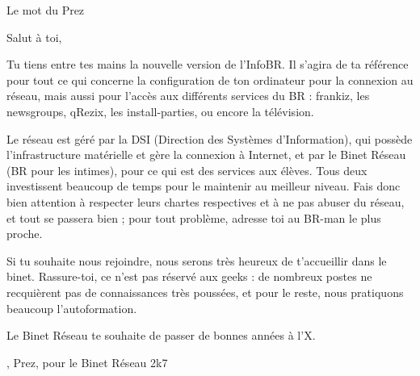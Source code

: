

\begin{center}
    { \Huge Le mot du Prez }
\end{center}

\indent \indent Salut \`a toi,

Tu tiens entre tes mains la nouvelle version de l'InfoBR. Il s'agira de ta r\'ef\'erence pour tout ce qui concerne la configuration de ton ordinateur pour la connexion au r\'eseau, mais aussi pour l'acc\`es aux diff\'erents services du BR :
frankiz, les newsgroups, qRezix, les install-parties, ou encore la t\'el\'evision.

Le r\'eseau est g\'er\'e par la DSI (Direction des Syst\`emes d'Information), qui poss\`ede l'infrastructure mat\'erielle et g\`ere la connexion \`a Internet,
et par le Binet R\'eseau (BR pour les intimes), pour ce qui est des services aux \'el\`eves. Tous deux investissent beaucoup de temps pour le maintenir au meilleur niveau.
Fais donc bien attention \`a respecter leurs chartes respectives et \`a ne pas abuser du r\'eseau, et tout se passera bien ; pour tout probl\`eme, adresse toi au
BR-man le plus proche.

Si tu souhaite nous rejoindre, nous serons tr\`es heureux de t'accueillir dans le binet. Rassure-toi, ce n'est pas r\'eserv\'e aux geeks : de nombreux postes ne recqui\`erent pas de connaissances tr\`es pouss\'ees, et pour le reste, nous pratiquons beaucoup l'autoformation.

Le Binet R\'eseau te souhaite de passer de bonnes ann\'ees \`a l'X.

\begin{flushright}
    , Prez, pour le Binet R\'eseau 2k7
\end{flushright}
